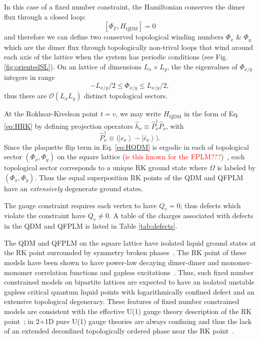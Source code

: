\documentclass[twocolumn,prb,aps,floatfix,superscriptaddress]{revtex4-1}
\newcommand{\figref}[1]{Fig. \ref{#1}}
\newcommand{\eket}[1]{\left | #1 \right \rangle}
\newcommand{\Eqref}[1]{Eq. \eqref{#1}}
\newcommand{\HQDM}{H_\mathrm{QDM}}
\begin{document}
In this case of a fixed number constraint, the Hamiltonian conserves the dimer flux through a closed loop:
\begin{equation}
\left[ \Phi_\Gamma, \HQDM \right] = 0
\end{equation}
and therefore we can define two conserved topological winding numbers $\Phi_{x}$ \& $\Phi_{y}$ which are the dimer flux through topologically non-trival loops that wind around each axis of the lattice when the system has periodic conditions (see \figref{fig:orientedSL}). On an lattice of dimensions $L_x\times L_y$, the the eigenvalues of $\Phi_{x/y}$ integers in range	
\begin{equation}
-L_{x/y}/2 \leq  \Phi_{x/y} \leq L_{x/y}/2,
\end{equation}
thus there are $\mathcal{O} (L_x L_y)$ distinct topological sectors. 

At the Rokhsar-Kivelson point $t=v$, we may write $\HQDM$ in the form of \Eqref{eq:HRK} by defining projection operators  $\hat{h}_\nu \equiv \hat{P}^\dagger_{\nu} \hat{P}_{\nu}$, with
\begin{equation}
\hat{P}^\dagger_\nu \equiv \biggl( \eket{ c_\nu} - \eket{\bar{c}_\nu} \biggr).
\end{equation} 
Since the plaquette flip term in \Eqref{eq:HQDM} is ergodic in each of topological sector $(\Phi_x,\Phi_y)$ on the square lattice (\textcolor{red}{is this known for the FPLM???})~\cite{????}, each topological sector corresponds to a unique RK ground state where $\Omega$ is labeled by $(\Phi_x,\Phi_y)$. Thus the equal superposition RK points of the QDM and QFPLM have an \emph{extensively} degenerate ground states.

The gauge constraint requires each vertex to have $Q_v = 0$; thus defects which violate the constraint have $Q_v \neq 0$. A table of the charges associated with defects in the QDM and QFPLM is listed in Table \ref{tab:defects}.

The QDM and QFPLM on the square lattice have isolated liquid ground states at the RK point surrounded by symmetry broken phases~\cite{Rokhsar1988,Leung1996,Syljuasen2005,Syljuasen2006,Syljuasen2004,Moessner2008}. The RK point of these models have been shown to have power-law decaying dimer-dimer and monomer-monomer correlation functions and gapless excitations~\cite{Fisher1961,Kasteleyn1961,Fisher1966a,Fisher1963,Kasteleyn1963a,Sutherland1988b,Sutherland1988a,Kohmoto1988a,Liang1988,Sutherland1988,Kohmoto1988,Levitov1990,Leung1996,Henley1997,Henley1997,Henley2004a,Pollmann2006}. Thus, such fixed number constrained models on bipartite lattices are expected to have an isolated unstable gapless critical quantum liquid points with logarithmically confined defect and an extensive topological degeneracy. These features of fixed number constrained models are consistent with the effective U(1) gauge theory description of the RK point~\cite{Fradkin2004,Fradkin1990,Moessner2001}; in 2+1D pure U(1) gauge theories are always confining and thus the lack of an extended deconfined topologically ordered phase near the RK point~\cite{PolyakovBook}.
\end{document}

